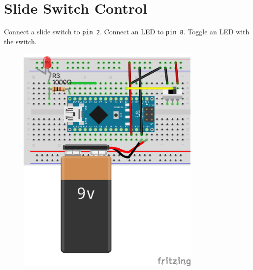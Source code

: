 \documentclass{article}
\begin{document}
\section*{Slide Switch Control}
\begin{minipage}{\textwidth}
Connect a slide switch to \texttt{pin 2}. Connect an LED to \texttt{pin 8}. Toggle an LED with the switch.
\end{minipage}
\begin{figure}[h!]
\centering
\includegraphics[width=0.8\textwidth]{led_switch_nano_bb.png}
\end{figure}
\newpage
\end{document}
